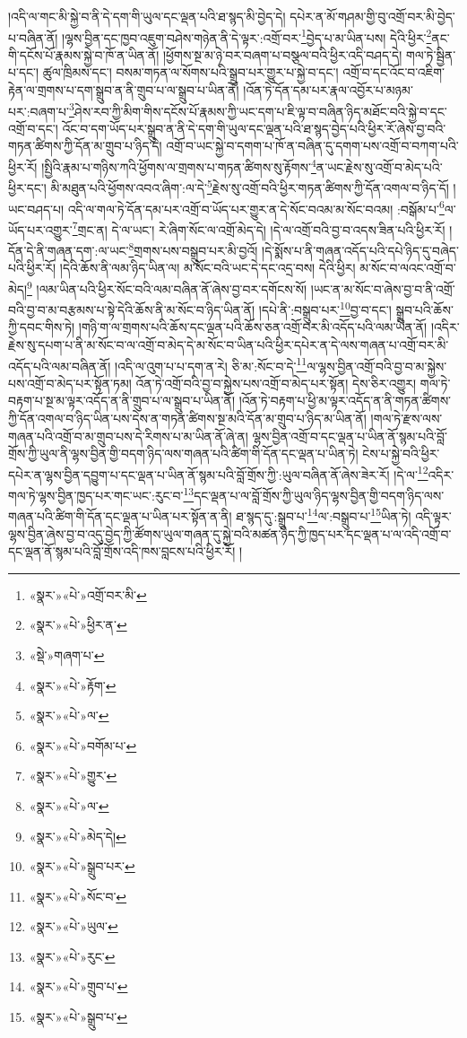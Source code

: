 །འདི་ལ་གང་མི་སྐྱེ་བ་ནི་དེ་དག་གི་ཡུལ་དང་ལྡན་པའི་ཐ་སྙད་མི་བྱེད་དེ། དཔེར་ན་མོ་གཤམ་གྱི་བུ་འགྲོ་བར་མི་བྱེད་པ་བཞིན་ནོ། །ལྷས་བྱིན་དང་ཁྱབ་འཇུག་བཤེས་གཉེན་ནི་དེ་ལྟར་:འགྲོ་བར་\footnote{«སྣར་»«པེ་»འགྲོ་བར་མི་}བྱེད་པ་མ་ཡིན་པས། དེའི་ཕྱིར་\footnote{«སྣར་»«པེ་»ཕྱིར་ན་}ནང་གི་དངོས་པོ་རྣམས་སྐྱེ་བ་ཁོ་ན་ཡིན་ནོ། །ཕྱོགས་སྔ་མ་ཉེ་བར་བཞག་པ་བསྩལ་བའི་ཕྱིར་འདི་བཤད་དེ། གལ་ཏེ་སྦྱིན་པ་དང་། ཚུལ་ཁྲིམས་དང་། བསམ་གཏན་ལ་སོགས་པའི་སྒྲུབ་པར་གྱུར་པ་སྐྱེ་བ་དང་། འགྲོ་བ་དང་འོང་བ་འཇིག་རྟེན་ལ་གྲགས་པ་དག་སྒྲུབ་ན་ནི་གྲུབ་པ་ལ་སྒྲུབ་པ་ཡིན་ནོ། །འོན་ཏེ་དོན་དམ་པར་རྣལ་འབྱོར་པ་མཉམ་པར་:བཞག་པ་\footnote{«སྡེ་»གཞག་པ་}ཤེས་རབ་ཀྱི་མིག་གིས་དངོས་པོ་རྣམས་ཀྱི་ཡང་དག་པ་ཇི་ལྟ་བ་བཞིན་ཉིད་མཐོང་བའི་སྐྱེ་བ་དང་འགྲོ་བ་དང་། འོང་བ་དག་ཡོད་པར་སྒྲུབ་ན་ནི་དེ་དག་གི་ཡུལ་དང་ལྡན་པའི་ཐ་སྙད་བྱེད་པའི་ཕྱིར་རོ་ཞེས་བྱ་བའི་གཏན་ཚིགས་ཀྱི་དོན་མ་གྲུབ་པ་ཉིད་དེ། འགྲོ་བ་ཡང་སྐྱེ་བ་དགག་པ་ཁོ་ན་བཞིན་དུ་དགག་པས་འགྲོ་བ་བཀག་པའི་ཕྱིར་རོ། །སྤྱིའི་རྣམ་པ་གཉིས་ཀའི་ཕྱོགས་ལ་གྲགས་པ་གཏན་ཚིགས་སུ་རྟོགས་\footnote{«སྣར་»«པེ་»རྟོག་}ན་ཡང་རྗེས་སུ་འགྲོ་བ་མེད་པའི་ཕྱིར་དང་། མི་མཐུན་པའི་ཕྱོགས་འབའ་ཞིག་:ལ་དེ་\footnote{«སྣར་»«པེ་»ལ་}རྗེས་སུ་འགྲོ་བའི་ཕྱིར་གཏན་ཚིགས་ཀྱི་དོན་འགལ་བ་ཉིད་དོ། །ཡང་བཤད་པ། འདི་ལ་གལ་ཏེ་དོན་དམ་པར་འགྲོ་བ་ཡོད་པར་གྱུར་ན་དེ་སོང་བའམ་མ་སོང་བའམ། :བསྒོམ་པ་\footnote{«སྣར་»«པེ་»བགོམ་པ་}ལ་ཡོད་པར་འགྱུར་\footnote{«སྣར་»«པེ་»གྱུར་}གྲང་ན། དེ་ལ་ཡང་། རེ་ཞིག་སོང་ལ་འགྲོ་མེད་དེ། །དེ་ལ་འགྲོ་བའི་བྱ་བ་འདས་ཟིན་པའི་ཕྱིར་རོ། །དོན་དེ་ནི་གཞན་དག་:ལ་ཡང་\footnote{«སྣར་»«པེ་»ལ་}གྲགས་པས་བསྒྲུབ་པར་མི་བྱའོ། །དེ་སྨོས་པ་ནི་གཞན་འདོད་པའི་དཔེ་ཉིད་དུ་བཞེད་པའི་ཕྱིར་རོ། །དེའི་ཆོས་ནི་ལམ་ཉིད་ཡིན་ལ། མ་སོང་བའི་ཡང་དེ་དང་འདྲ་བས། དེའི་ཕྱིར། མ་སོང་བ་ལའང་འགྲོ་བ་མེད།\footnote{«སྣར་»«པེ་»མེད་དེ།} །ལམ་ཡིན་པའི་ཕྱིར་སོང་བའི་ལམ་བཞིན་ནོ་ཞེས་བྱ་བར་དགོངས་སོ། །ཡང་ན་མ་སོང་བ་ཞེས་བྱ་བ་ནི་འགྲོ་བའི་བྱ་བ་མ་བརྩམས་པ་སྟེ་དེའི་ཆོས་ནི་མ་སོང་བ་ཉིད་ཡིན་ནོ། །དཔེ་ནི་:བསྒྲུབ་པར་\footnote{«སྣར་»«པེ་»སྒྲུབ་པར་}བྱ་བ་དང་། སྒྲུབ་པའི་ཆོས་ཀྱི་དབང་གིས་ཏེ། །གཉི་ག་ལ་གྲགས་པའི་ཆོས་དང་ལྡན་པའི་ཆོས་ཅན་འགྲོ་བར་མི་འདོད་པའི་ལམ་ཡིན་ནོ། །འདིར་རྗེས་སུ་དཔག་པ་ནི་མ་སོང་བ་ལ་འགྲོ་བ་མེད་དེ་མ་སོང་བ་ཡིན་པའི་ཕྱིར་དཔེར་ན་དེ་ལས་གཞན་པ་འགྲོ་བར་མི་འདོད་པའི་ལམ་བཞིན་ནོ། །འདི་ལ་འུག་པ་པ་དག་ན་རེ། ཅི་མ་:སོང་བ་དེ་\footnote{«སྣར་»«པེ་»སོང་བ་}ལ་ལྷས་བྱིན་འགྲོ་བའི་བྱ་བ་མ་སྐྱེས་པས་འགྲོ་བ་མེད་པར་སྟོན་ཏམ། འོན་ཏེ་འགྲོ་བའི་བྱ་བ་སྐྱེས་པས་འགྲོ་བ་མེད་པར་སྟོན། དེས་ཅིར་འགྱུར། གལ་ཏེ་བརྟག་པ་སྔ་མ་ལྟར་འདོད་ན་ནི་གྲུབ་པ་ལ་སྒྲུབ་པ་ཡིན་ནོ། །འོན་ཏེ་བརྟག་པ་ཕྱི་མ་ལྟར་འདོད་ན་ནི་གཏན་ཚིགས་ཀྱི་དོན་འགལ་བ་ཉིད་ཡིན་པས་དེས་ན་གཏན་ཚིགས་སྔ་མའི་དོན་མ་གྲུབ་པ་ཉིད་མ་ཡིན་ནོ། །གལ་ཏེ་རྫས་ལས་གཞན་པའི་འགྲོ་བ་མ་གྲུབ་པས་དེ་རིགས་པ་མ་ཡིན་ནོ་ཞེ་ན། ལྷས་བྱིན་འགྲོ་བ་དང་ལྡན་པ་ཡིན་ནོ་སྙམ་པའི་བློ་གྲོས་ཀྱི་ཡུལ་ནི་ལྷས་བྱིན་གྱི་བདག་ཉིད་ལས་གཞན་པའི་ཚིག་གི་དོན་དང་ལྡན་པ་ཡིན་ཏེ། ངེས་པ་སྐྱེ་བའི་ཕྱིར་དཔེར་ན་ལྷས་བྱིན་དབྱུག་པ་དང་ལྡན་པ་ཡིན་ནོ་སྙམ་པའི་བློ་གྲོས་ཀྱི་:ཡུལ་བཞིན་ནོ་ཞེས་ཟེར་རོ། །དེ་ལ་\footnote{«སྣར་»«པེ་»ཡུལ་}འདིར་གལ་ཏེ་ལྷས་བྱིན་ཁྱད་པར་གང་ཡང་:རུང་བ་\footnote{«སྣར་»«པེ་»རུང་}དང་ལྡན་པ་ལ་བློ་གྲོས་ཀྱི་ཡུལ་ཉིད་ལྷས་བྱིན་གྱི་བདག་ཉིད་ལས་གཞན་པའི་ཚིག་གི་དོན་དང་ལྡན་པ་ཡིན་པར་སྟོན་ན་ནི། ཐ་སྙད་དུ་:སྒྲུབ་པ་\footnote{«སྣར་»«པེ་»གྲུབ་པ་}ལ་:བསྒྲུབ་པ་\footnote{«སྣར་»«པེ་»སྒྲུབ་པ་}ཡིན་ཏེ། འདི་ལྟར་ལྷས་བྱིན་ཞེས་བྱ་བ་འདུ་བྱེད་ཀྱི་ཚོགས་ཡུལ་གཞན་དུ་སྐྱེ་བའི་མཚན་ཉིད་ཀྱི་ཁྱད་པར་དང་ལྡན་པ་ལ་འདི་འགྲོ་བ་དང་ལྡན་ནོ་སྙམ་པའི་བློ་གྲོས་འདི་ཁས་བླངས་པའི་ཕྱིར་རོ། །

